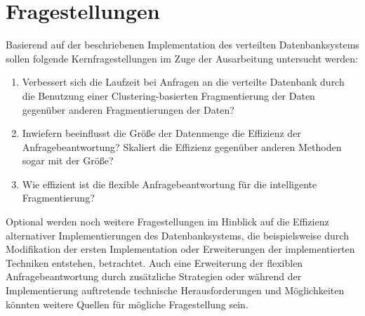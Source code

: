 \documentclass[a4paper, 11pt]{article}
\begin{document}
\section{Fragestellungen}
Basierend auf der beschriebenen Implementation des verteilten Datenbanksystems sollen folgende Kernfragestellungen im Zuge der Ausarbeitung untersucht werden:
\begin{enumerate}
    \item Verbessert sich die Laufzeit bei Anfragen an die verteilte Datenbank durch die Benutzung einer Clustering-basierten Fragmentierung der Daten
        gegenüber anderen Fragmentierungen der Daten?
    \item Inwiefern beeinflusst die Größe der Datenmenge die Effizienz der Anfragebeantwortung? Skaliert die Effizienz gegenüber anderen Methoden sogar mit der
        Größe?
    \item Wie effizient ist die flexible Anfragebeantwortung für die intelligente Fragmentierung?
\end{enumerate}

Optional werden noch weitere Fragestellungen im Hinblick auf die Effizienz alternativer Implementierungen des Datenbanksystems, die beispielsweise durch
Modifikation der ersten Implementation oder Erweiterungen der implementierten Techniken entstehen, betrachtet. Auch eine Erweiterung der flexiblen
Anfragebeantwortung durch zusätzliche Strategien oder während der Implementierung auftretende technische Herausforderungen und Möglichkeiten könnten weitere
Quellen für mögliche Fragestellung sein.

\newpage

\end{document}
